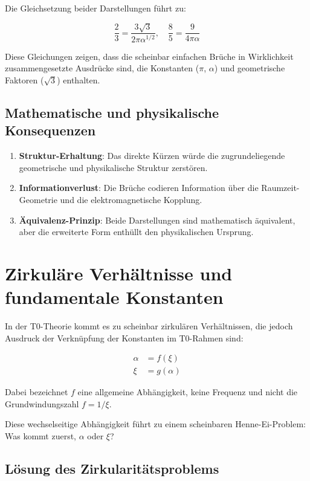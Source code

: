 	Die Gleichsetzung beider Darstellungen führt zu:
	
	\[
	\frac{2}{3} = \frac{3\sqrt{3}}{2\pi\alpha^{1/2}}, \quad \frac{8}{5} = \frac{9}{4\pi\alpha}
	\]
	
	Diese Gleichungen zeigen, dass die scheinbar einfachen Brüche in Wirklichkeit zusammengesetzte Ausdrücke sind, die Konstanten ($\pi$, $\alpha$) und geometrische Faktoren ($\sqrt{3}$) enthalten.
	
	\subsection*{Mathematische und physikalische Konsequenzen}
	
	\begin{enumerate}
		\item \textbf{Struktur-Erhaltung}: Das direkte Kürzen würde die zugrundeliegende geometrische und physikalische Struktur zerstören.
		
		\item \textbf{Informationverlust}: Die Brüche codieren Information über die Raumzeit-Geometrie und die elektromagnetische Kopplung.
		
		\item \textbf{Äquivalenz-Prinzip}: Beide Darstellungen sind mathematisch äquivalent, aber die erweiterte Form enthüllt den physikalischen Ursprung.
	\end{enumerate}
	
	\section{Zirkuläre Verhältnisse und fundamentale Konstanten}
\label{sec:zirkulaer}

In der T0-Theorie kommt es zu scheinbar zirkulären Verhältnissen, die jedoch Ausdruck der Verknüpfung der Konstanten im T0-Rahmen sind:

\begin{align*}
	\alpha &= f(\xi) \\
	\xi &= g(\alpha)
\end{align*}

Dabei bezeichnet $f$ eine allgemeine Abhängigkeit, keine Frequenz und nicht die Grundwindungszahl $f = 1/\xi$.

Diese wechselseitige Abhängigkeit führt zu einem scheinbaren Henne-Ei-Problem: Was kommt zuerst, $\alpha$ oder $\xi$?

\subsection{Lösung des Zirkularitätsproblems}

